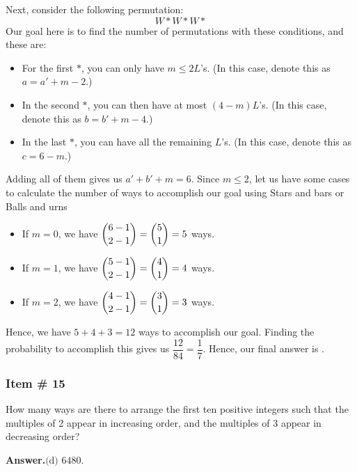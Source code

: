 \documentclass[11pt,paper=letter]{scrartcl}
\newcommand{\ans}[1]{{\sffamily \bfseries Answer.}\;\(\boxed{\text{#1}}\).}
\begin{document}
Next, consider the following permutation: $$W * W * W*$$ Our goal here is to find the number of permutations with these conditions, and these are:

\begin{itemize}
    \item For the first $*$, you can only have $m \leq 2 L$'s. (In this case, denote this as $a = a' + m - 2.$)
    \item In the second $*$, you can then have at most $(4 - m) L$'s. (In this case, denote this as $b = b' + m - 4.$)
    \item In the last $*$, you can have all the remaining $L$'s. (In this case, denote this as $c = 6 - m.$)
  
     \end{itemize}
     
   Adding all of them gives us $a' + b ' + m = 6$. Since $m \leq 2$, let us have some cases to calculate the number of ways to accomplish our goal using Stars and bars or Balls and urns
   
   \begin{itemize}
       \item If $m=0$, we have $\dbinom{6-1}{2-1} = \dbinom{5}{1} = 5$ ways.
       
       \item If $m=1$, we have $\dbinom{5-1}{2-1} = \dbinom{4}{1} = 4$ ways.
       
       \item If $m=2$, we have $\dbinom{4-1}{2-1} = \dbinom{3}{1} = 3$ ways.
   \end{itemize}
   
   Hence, we have $5+4+3 = 12$ ways to accomplish our goal. Finding the probability to accomplish this gives us $\dfrac{12}{84} = \dfrac{1}{7}$. Hence, our final answer is .


\subsubsection{Item \# 15}

\begin{probboxed}
How many ways are there to arrange the first ten positive integers such that the multiples of 2 appear in increasing order, and the multiples of 3 appear in decreasing order?

\end{probboxed}

\ans{(d) 6480}
\end{document}
